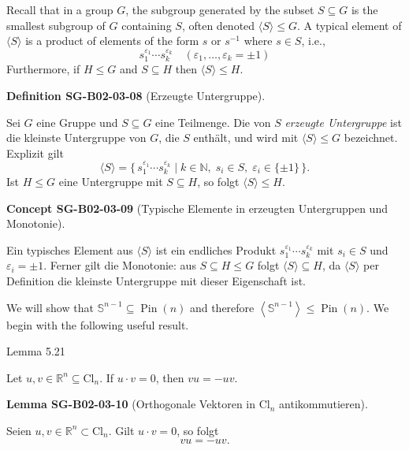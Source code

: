 \documentclass[10pt, letterpaper]{article}
\newcommand{\R}{\mathbb{R}}
\newcommand{\N}{\mathbb{N}}
\newcommand{\Cl}{\mathrm{Cl}}
\newcommand{\CustomHeading}[3]{%
  \par\medskip\noindent%
  \textbf{#1 #2} \textnormal{(#3)}.\enskip%
}
\newenvironment{DEF}[2]{\begin{unitbox}\CustomHeading{Definition}{#1}{#2}}{\end{unitbox}}
\newenvironment{LEM}[2]{\begin{unitbox}\CustomHeading{Lemma}{#1}{#2}}{\end{unitbox}}
\newenvironment{CONC}[2]{\begin{unitbox}\CustomHeading{Concept}{#1}{#2}}{\end{unitbox}}
\begin{document}
Recall that in a group $G$, the subgroup generated by the subset $S \subseteq G$ is the smallest subgroup of $G$ containing $S$, often denoted $\langle S\rangle \leqslant G$. A typical element of $\langle S\rangle$ is a product of elements of the form $s$ or $s^{-1}$ where $s \in S$, i.e.,
$$
s_{1}^{\varepsilon_{1}} \cdots s_{k}^{\varepsilon_{k}} \quad\left(\varepsilon_{1}, \ldots, \varepsilon_{k}= \pm 1\right) 
$$
Furthermore, if $H \leqslant G$ and $S \subseteq H$ then $\langle S\rangle \leqslant H$.



\begin{DEF}{SG-B02-03-08}{Erzeugte Untergruppe}
Sei \(G\) eine Gruppe und \(S \subseteq G\) eine Teilmenge.
Die von \(S\) \emph{erzeugte Untergruppe} ist die kleinste Untergruppe von \(G\),
die \(S\) enthält, und wird mit \(\langle S\rangle \le G\) bezeichnet.
Explizit gilt
\[
\langle S\rangle
=\Big\{\, s_1^{\varepsilon_1}\cdots s_k^{\varepsilon_k}
\;\Big|\; k\in\N,\; s_i\in S,\; \varepsilon_i\in\{\pm1\}\,\Big\}.
\]
Ist \(H \le G\) eine Untergruppe mit \(S\subseteq H\), so folgt \(\langle S\rangle \le H\).
\end{DEF}



\begin{CONC}{SG-B02-03-09}{Typische Elemente in erzeugten Untergruppen und Monotonie}
Ein typisches Element aus \(\langle S\rangle\) ist ein endliches Produkt
\(
s_1^{\varepsilon_1}\cdots s_k^{\varepsilon_k}
\) mit \(s_i\in S\) und \(\varepsilon_i=\pm1\).
Ferner gilt die Monotonie: aus \(S\subseteq H\le G\) folgt
\(\langle S\rangle\subseteq H\), da \(\langle S\rangle\) per Definition die
kleinste Untergruppe mit dieser Eigenschaft ist.
\end{CONC}



We will show that $\mathbb{S}^{n-1} \subseteq \operatorname{Pin}(n)$ and therefore $\left\langle\mathbb{S}^{n-1}\right\rangle \leqslant \operatorname{Pin}(n)$. We begin with the following useful result.



Lemma 5.21


Let $u, v \in \mathbb{R}^{n} \subseteq \mathrm{Cl}_{n}$. If $u \cdot v=0$, then $v u=-u v$.


\begin{LEM}{SG-B02-03-10}{Orthogonale Vektoren in $\Cl_n$ antikommutieren}
Seien \(u,v\in \R^n\subset \Cl_n\). Gilt \(u\cdot v=0\), so folgt
\[
vu=-uv.
\]
\end{LEM}
\end{document}
